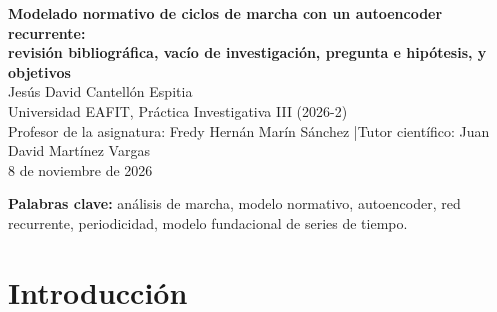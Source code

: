 \documentclass[11pt,a4paper]{article}
\newcommand{\R}{\mathbb{R}}
\begin{document}
\begin{center}
{\large\bfseries Modelado normativo de ciclos de marcha con un autoencoder recurrente:\\ revisión bibliográfica, vacío de investigación, pregunta e hipótesis, y objetivos}\\[8pt]
Jesús David Cantellón Espitia\\
{\small Universidad EAFIT, Práctica Investigativa III (2026-2)}\\
{\small Profesor de la asignatura: Fredy Hernán Marín Sánchez \quad|\quad Tutor científico: Juan David Martínez Vargas}\\
{\small 8 de noviembre de 2026}
\end{center}

\begin{abstract}\noindent
Este informe presenta la introducción de un estudio sobre modelos normativos de ciclos de marcha, enmarcado en el proyecto NeuroStrideAI (exoesqueleto pediátrico). Cada ciclo se representa como un punto de $\R^{101\times 6}$ (101 instantes del ciclo y seis ángulos articulares) y se modela con un autoencoder recurrente. Se expone el método de una revisión bibliográfica dirigida por cuatro preguntas (índices y referencias normativas de marcha, autoencoders aplicados a marcha, periodicidad del ciclo, y modelos fundacionales de series de tiempo) y se sintetizan 24 fuentes. A partir de la revisión y de la comparación inicial del proyecto, en la que el autoencoder recurrente tuvo el mayor error de reconstrucción entre los modelos que aprenden de los datos y produjo ciclos cuyos extremos no coinciden, se identifican una incoherencia y tres vacíos. Se formaliza el problema, se proponen una pregunta de investigación y cinco hipótesis con contenido matemático (cada una con su estadístico y criterio de decisión) y se definen un objetivo general y cinco objetivos específicos medibles, alineados con las hipótesis.
\end{abstract}

\noindent\textbf{Palabras clave:} análisis de marcha, modelo normativo, autoencoder, red recurrente, periodicidad, modelo fundacional de series de tiempo.

\section{Introducción}
\end{document}
